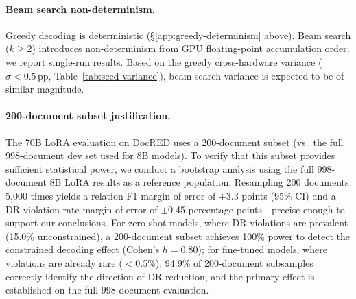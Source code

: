 \paragraph{Beam search non-determinism.}
Greedy decoding is deterministic (\S\ref{app:greedy-determinism} above).
Beam search ($k{\geq}2$) introduces non-determinism from GPU floating-point accumulation order; we report single-run results.
Based on the greedy cross-hardware variance ($\sigma < 0.5$\,pp, Table~\ref{tab:seed-variance}), beam search variance is expected to be of similar magnitude.

\paragraph{200-document subset justification.}
\label{app:power-analysis}
The 70B LoRA evaluation on DocRED uses a 200-document subset (vs.\ the full 998-document dev set used for 8B models).
To verify that this subset provides sufficient statistical power, we conduct a bootstrap analysis using the full 998-document 8B LoRA results as a reference population.
Resampling 200 documents 5{,}000 times yields a relation F1 margin of error of $\pm$3.3 points (95\% CI) and a DR violation rate margin of error of $\pm$0.45 percentage points---precise enough to support our conclusions.
For zero-shot models, where DR violations are prevalent (15.0\% unconstrained), a 200-document subset achieves 100\% power to detect the constrained decoding effect (Cohen's $h = 0.80$); for fine-tuned models, where violations are already rare ($<$0.5\%), 94.9\% of 200-document subsamples correctly identify the direction of DR reduction, and the primary effect is established on the full 998-document evaluation.
